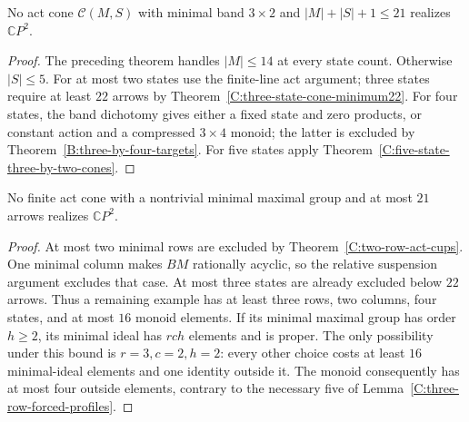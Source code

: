 \begin{corollary}
\label{C:three-row-act-cones21}
No act cone $\mathcal C(M,S)$ with minimal band $3\times2$
and $|M|+|S|+1\leq21$ realizes $\mathbb CP^2$.
\end{corollary}
\begin{proof}
The preceding theorem handles $|M|\leq14$ at every state
count.  Otherwise $|S|\leq5$.  For at most two states use
the finite-line act argument; three states require at least
$22$ arrows by Theorem~\ref{C:three-state-cone-minimum22}.
For four states, the band dichotomy gives either a fixed state
and zero products, or constant action and a compressed
$3\times4$ monoid; the latter is excluded by
Theorem~\ref{B:three-by-four-targets}.
For five states apply
Theorem~\ref{C:five-state-three-by-two-cones}.
\end{proof}

\begin{corollary}
\label{C:nontrivial-minimal-group-act-cones21}
No finite act cone with a nontrivial minimal maximal group and
at most $21$ arrows realizes $\mathbb CP^2$.
\end{corollary}
\begin{proof}
At most two minimal rows are excluded by
Theorem~\ref{C:two-row-act-cups}.  One minimal column makes
$BM$ rationally acyclic, so the relative suspension argument
excludes that case.  At most three states are already excluded
below $22$ arrows.  Thus a remaining example has at least three
rows, two columns, four states, and at most $16$ monoid elements.
If its minimal maximal group has order $h\geq2$, its minimal
ideal has $rch$ elements and is proper.  The only possibility
under this bound is $r=3,c=2,h=2$: every other choice costs at
least $16$ minimal-ideal elements and one identity outside it.
The monoid consequently has at most four outside elements,
contrary to the necessary five of
Lemma~\ref{C:three-row-forced-profiles}.
\end{proof}
